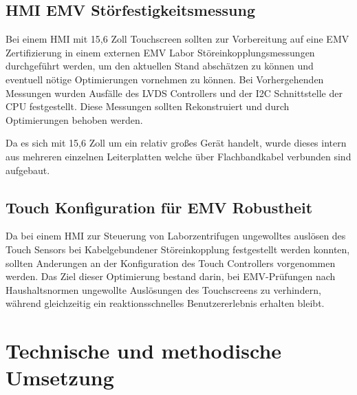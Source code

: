\documentclass[praktikum,german]{hgbthesis}
\begin{document}
\section{HMI EMV Störfestigkeitsmessung}
Bei einem HMI mit 15,6 Zoll Touchscreen sollten zur Vorbereitung auf eine EMV Zertifizierung in einem externen EMV Labor Störeinkopplungsmessungen durchgeführt werden, um den aktuellen Stand abschätzen zu können und eventuell nötige Optimierungen vornehmen zu können. Bei Vorhergehenden Messungen wurden Ausfälle des LVDS Controllers und der I2C Schnittstelle der CPU festgestellt. Diese Messungen sollten Rekonstruiert und durch Optimierungen behoben werden.

Da es sich mit 15,6 Zoll um ein relativ großes Gerät handelt, wurde dieses intern aus mehreren einzelnen Leiterplatten welche über Flachbandkabel verbunden sind aufgebaut.

\section{Touch Konfiguration für EMV Robustheit}
Da bei einem HMI zur Steuerung von Laborzentrifugen ungewolltes auslösen des Touch Sensors bei Kabelgebundener Störeinkopplung festgestellt werden konnten, sollten Anderungen an der Konfiguration des Touch Controllers vorgenommen werden. Das Ziel dieser Optimierung bestand darin, bei EMV-Prüfungen nach Haushaltsnormen ungewollte Auslösungen des Touchscreens zu verhindern, während gleichzeitig ein reaktionsschnelles Benutzererlebnis erhalten bleibt.

\chapter{Technische und methodische Umsetzung}

\end{document}
